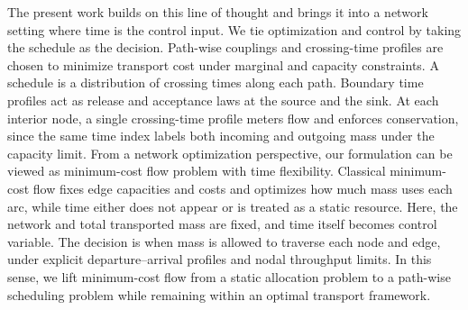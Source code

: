 \documentclass[11pt]{article}
\begin{document}


The present work builds on this line of thought and brings it into a network setting where time is the control input. We tie optimization and control by taking the schedule as the decision. Path-wise couplings and crossing-time profiles are chosen to minimize transport cost under marginal and capacity constraints. A schedule is a distribution of crossing times along each path. Boundary time profiles act as release and acceptance laws at the source and the sink. At each interior node, a single crossing-time profile meters flow and enforces conservation, since the same time index labels both incoming and outgoing mass under the capacity limit. From a network optimization perspective, our formulation can be viewed as minimum-cost flow problem with time flexibility. Classical minimum-cost flow fixes edge capacities and costs and optimizes how much mass uses each arc, while time either does not appear or is treated as a static resource. Here, the network and total transported mass are fixed, and time itself becomes control variable. The decision is when mass is allowed to traverse each node and edge, under explicit departure–arrival profiles and nodal throughput limits. In this sense, we lift minimum-cost flow from a static allocation problem to a path-wise scheduling problem while remaining within an optimal transport framework.
\end{document}

